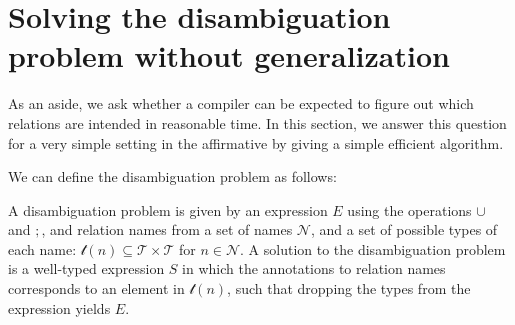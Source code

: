 \documentclass[12pt]{article}
\begin{document}
%
%
%
%

\section{Solving the disambiguation problem without generalization}
As an aside, we ask whether a compiler can be expected to figure out which relations are intended in reasonable time. In this section, we answer this question for a very simple setting in the affirmative by giving a simple efficient algorithm.

We can define the disambiguation problem as follows:

A disambiguation problem is given by an expression $E$ using the operations $\cup$ and $;$, and relation names from a set of names $\mathcal{N}$, and a set of possible types of each name: $\mathcal{t}(n) \subseteq \mathcal{T}\times \mathcal{T}$ for $n\in \mathcal{N}$.
A solution to the disambiguation problem is a well-typed expression $S$ in which the annotations to relation names corresponds to an element in $\mathcal{t}(n)$, such that dropping the types from the expression yields $E$.
\end{document}
